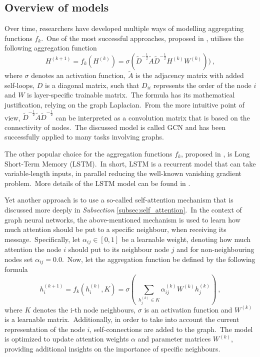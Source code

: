 \documentclass[longabstract, english, mgr]{iithesis}
\theoremstyle{default_theorem_style}\newtheorem{theorem}{Theorem}
\theoremstyle{default_theorem_style}\newtheorem{definition}{Definition}
\begin{document}
\subsection{Overview of models}

Over time, researchers have developed multiple ways of modelling aggregating functions $f_k$.\ One of the most
successful approaches, proposed in \cite{gcn_model}, utilises the following aggregation function
$$
H^{(k + 1)} = f_k(H^{(k)}) = \sigma(\tilde{D}^{-\frac{1}{2}} \tilde{A} \tilde{D}^{-\frac{1}{2}} H^{(k)} W^{(k)}))\ ,
$$
where $\sigma$ denotes an activation function, $\tilde{A}$ is the adjacency matrix with added self-loops, $D$ is
a diagonal matrix, such that $D_{ii}$ represents the order of the node $i$ and $W$ is layer-specific trainable
matrix.\ The formula has its mathematical justification, relying on the graph Laplacian.\ From the more intuitive
point of view, $\tilde{D}^{-\frac{1}{2}} \tilde{A} \tilde{D}^{-\frac{1}{2}}$ can be interpreted as a convolution matrix
that is based on the connectivity of nodes.\ The discussed model is called GCN and has been successfully applied
to many tasks involving graphs.\newline

\noindent The other popular choice for the aggregation functions $f_k$, proposed in \cite{graphsage}, is
Long Short-Term Memory (LSTM).\ In short, LSTM is a recurrent model that can take variable-length
inputs, in parallel reducing the well-known vanishing gradient problem.\ More details of the LSTM model can be found
in \cite{goodfellow_book}.\newline

\noindent Yet another approach is to use a so-called self-attention mechanism that is discussed more deeply in
\textit{Subsection} \ref{subsec:self_attention}.\ In the context of graph neural networks, the above-mentioned
mechanism is used to learn how much attention should be put to a specific neighbour, when receiving its
message.\ Specifically, let $\alpha_{ij} \in [0, 1]$ be a learnable weight, denoting how much attention the node
$i$ should put to its neighbour node $j$ and for non-neighbouring nodes set $\alpha_{ij} = 0.0$.\ Now, let the
aggregation function be defined by the following formula
$$
h_i^{(k + 1)} = f_k(h_i^{(k)}, K) = \sigma \left(\ \sum_{h_j^{(k)} \in K} \alpha_{ij}^{(k)} W^{(k)} h_j^{(k)} \right)\ ,
$$
where $K$ denotes the i-th node neighbours, $\sigma$ is an activation function and $W^{(k)}$ is a learnable
matrix.\ Additionally, in order to take into account the current representation of the node $i$, self-connections
are added to the graph.\ The model is optimized to update attention weights $\alpha$ and parameter matrices
$W^{(k)}$, providing additional insights on the importance of specific neighbours.\newline
\end{document}
